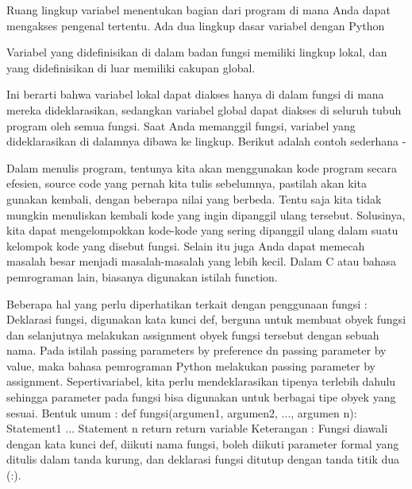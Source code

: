 Ruang lingkup variabel menentukan bagian dari program di mana Anda dapat mengakses pengenal tertentu. Ada dua lingkup dasar variabel dengan Python 

Variabel yang didefinisikan di dalam badan fungsi memiliki lingkup lokal, dan yang didefinisikan di luar memiliki cakupan global. 

Ini berarti bahwa variabel lokal dapat diakses hanya di dalam fungsi di mana mereka dideklarasikan, sedangkan variabel global dapat diakses di seluruh tubuh program oleh semua fungsi. Saat Anda memanggil fungsi, variabel yang dideklarasikan di dalamnya dibawa ke lingkup. Berikut adalah contoh sederhana - \par

Dalam   menulis   program, tentunya   kita   akan menggunakan kode program secara efesien, source code yang pernah kita tulis sebelumnya, pastilah akan kita  
gunakan  kembali,  dengan  beberapa  nilai  yang  berbeda. 
Tentu saja kita tidak mungkin menuliskan kembali  kode  yang  ingin  dipanggil  ulang  tersebut.  
Solusinya,  kita  dapat  mengelompokkan  kode-kode  yang sering dipanggil ulang dalam suatu kelompok kode yang disebut fungsi. 
Selain  itu  juga  Anda  dapat  memecah  masalah  besar  menjadi  masalah-masalah  yang  lebih  kecil.  Dalam  C  atau  bahasa  pemrograman  lain,  biasanya  digunakan istilah function. 

Beberapa hal yang perlu diperhatikan terkait dengan penggunaan fungsi :
Deklarasi fungsi, digunakan kata kunci def, berguna untuk membuat obyek fungsi dan selanjutnya melakukan assignment obyek fungsi tersebut dengan sebuah nama.
Pada istilah passing parameters by preference dn passing parameter by value, maka bahasa pemrograman Python melakukan passing parameter
by assignment.
Sepertivariabel, kita perlu mendeklarasikan tipenya terlebih dahulu sehingga parameter pada fungsi bisa digunakan untuk berbagai tipe obyek yang sesuai.
Bentuk umum :
def fungsi(argumen1, argumen2, ..., argumen n):
 Statement1
 ...
 Statement n
 return return variable
Keterangan : 
Fungsi diawali dengan kata kunci def, diikuti nama fungsi, boleh diikuti parameter formal yang ditulis dalam tanda kurung, dan deklarasi fungsi ditutup dengan tanda titik dua (:).

